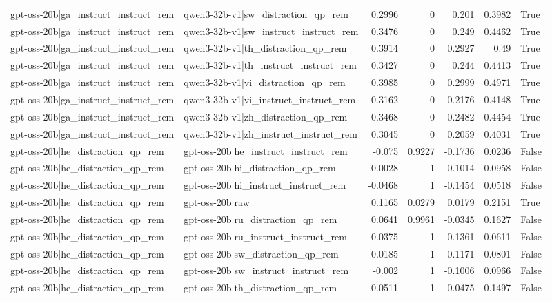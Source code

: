 \begin{table}
\begin{tabular}{l l r r r r l}
gpt-oss-20b|ga_instruct_instruct_rem & qwen3-32b-v1|sw_distraction_qp_rem & 0.2996 & 0 & 0.201 & 0.3982 & True \\
gpt-oss-20b|ga_instruct_instruct_rem & qwen3-32b-v1|sw_instruct_instruct_rem & 0.3476 & 0 & 0.249 & 0.4462 & True \\
gpt-oss-20b|ga_instruct_instruct_rem & qwen3-32b-v1|th_distraction_qp_rem & 0.3914 & 0 & 0.2927 & 0.49 & True \\
gpt-oss-20b|ga_instruct_instruct_rem & qwen3-32b-v1|th_instruct_instruct_rem & 0.3427 & 0 & 0.244 & 0.4413 & True \\
gpt-oss-20b|ga_instruct_instruct_rem & qwen3-32b-v1|vi_distraction_qp_rem & 0.3985 & 0 & 0.2999 & 0.4971 & True \\
gpt-oss-20b|ga_instruct_instruct_rem & qwen3-32b-v1|vi_instruct_instruct_rem & 0.3162 & 0 & 0.2176 & 0.4148 & True \\
gpt-oss-20b|ga_instruct_instruct_rem & qwen3-32b-v1|zh_distraction_qp_rem & 0.3468 & 0 & 0.2482 & 0.4454 & True \\
gpt-oss-20b|ga_instruct_instruct_rem & qwen3-32b-v1|zh_instruct_instruct_rem & 0.3045 & 0 & 0.2059 & 0.4031 & True \\
gpt-oss-20b|he_distraction_qp_rem & gpt-oss-20b|he_instruct_instruct_rem & -0.075 & 0.9227 & -0.1736 & 0.0236 & False \\
gpt-oss-20b|he_distraction_qp_rem & gpt-oss-20b|hi_distraction_qp_rem & -0.0028 & 1 & -0.1014 & 0.0958 & False \\
gpt-oss-20b|he_distraction_qp_rem & gpt-oss-20b|hi_instruct_instruct_rem & -0.0468 & 1 & -0.1454 & 0.0518 & False \\
gpt-oss-20b|he_distraction_qp_rem & gpt-oss-20b|raw & 0.1165 & 0.0279 & 0.0179 & 0.2151 & True \\
gpt-oss-20b|he_distraction_qp_rem & gpt-oss-20b|ru_distraction_qp_rem & 0.0641 & 0.9961 & -0.0345 & 0.1627 & False \\
gpt-oss-20b|he_distraction_qp_rem & gpt-oss-20b|ru_instruct_instruct_rem & -0.0375 & 1 & -0.1361 & 0.0611 & False \\
gpt-oss-20b|he_distraction_qp_rem & gpt-oss-20b|sw_distraction_qp_rem & -0.0185 & 1 & -0.1171 & 0.0801 & False \\
gpt-oss-20b|he_distraction_qp_rem & gpt-oss-20b|sw_instruct_instruct_rem & -0.002 & 1 & -0.1006 & 0.0966 & False \\
gpt-oss-20b|he_distraction_qp_rem & gpt-oss-20b|th_distraction_qp_rem & 0.0511 & 1 & -0.0475 & 0.1497 & False \\

\end{tabular}
\end{table}
